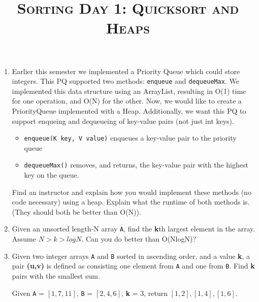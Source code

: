 \documentclass{article}
\title{\large{\textsc{Sorting Day 1: Quicksort and Heaps}}}
\date{}
\begin{document}
\maketitle

\subsection*{}

\begin{enumerate}
		
	\item Earlier this semester we implemented a Priority Queue which could store integers. This PQ supported two methods: \texttt{enqueue} and \texttt{dequeueMax}. We implemented this data structure using an ArrayList, resulting in O(1) time for one operation, and O(N) for the other. Now, we would like to create a PriorityQueue implemented with a Heap. Additionally, we want this PQ to support enqueing and dequeueing of key-value pairs (not just int keys).
	      	      
	      \begin{itemize}
	      	\item \texttt{enqueue(K key, V value)} enqueues a key-value pair to the priority queue
	      	\item \texttt{dequeueMax()} removes, and returns, the key-value pair with the highest key on the queue.
	      \end{itemize}
	      	      
	      Find an instructor and explain how you would implement these methods (no code necessary) using a heap. Explain what the runtime of both methods is. (They should both be better than O(N)).
	      	      
	\item Given an unsorted length-N array \texttt{A}, find the \textbf{k}th largest element in the array. Assume $N > k > logN$. Can you do better than O(NlogN)?
	      	      
	\item Given two integer arrays \texttt{A} and \texttt{B} sorted in ascending order, and a value \textbf{k}, a pair \textbf{(u,v)} is defined as consisting one element from \texttt{A} and one from \texttt{B}. Find \textbf{k} pairs with the smallest sum.
	      	      
	      Given \texttt{A} = $[1,7,11]$, \texttt{B} = $[2,4,6]$, \textbf{k} = 3, return $[1,2], [1,4], [1,6]$.
	      	      

\end{enumerate}
\end{document}
